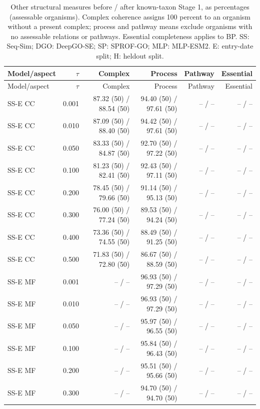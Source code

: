 \begingroup\scriptsize
\setlength{\tabcolsep}{4pt}
\begin{longtable}{lrrrrr}
\caption{Other structural measures before / after known-taxon Stage 1, as percentages (assessable organisms). Complex coherence assigns 100 percent to an organism without a present complex; process and pathway means exclude organisms with no assessable relations or pathways. Essential completeness applies to BP. SS: Seq-Sim; DGO: DeepGO-SE; SP: SPROF-GO; MLP: MLP-ESM2. E: entry-date split; H: heldout split.}\label{tab:supp-threshold-structure}\\
\toprule
Model/aspect & $\tau$ & Complex & Process & Pathway & Essential \\
\midrule
\endfirsthead
\toprule
Model/aspect & $\tau$ & Complex & Process & Pathway & Essential \\
\midrule
\endhead
SS-E CC & 0.001 & 87.32 (50) / 88.54 (50) & 94.40 (50) / 97.61 (50) & -- / -- & -- / -- \\
SS-E CC & 0.010 & 87.09 (50) / 88.40 (50) & 94.42 (50) / 97.61 (50) & -- / -- & -- / -- \\
SS-E CC & 0.050 & 83.33 (50) / 84.87 (50) & 92.70 (50) / 97.22 (50) & -- / -- & -- / -- \\
SS-E CC & 0.100 & 81.23 (50) / 82.41 (50) & 92.43 (50) / 97.11 (50) & -- / -- & -- / -- \\
SS-E CC & 0.200 & 78.45 (50) / 79.66 (50) & 91.14 (50) / 95.13 (50) & -- / -- & -- / -- \\
SS-E CC & 0.300 & 76.00 (50) / 77.24 (50) & 89.53 (50) / 94.24 (50) & -- / -- & -- / -- \\
SS-E CC & 0.400 & 73.36 (50) / 74.55 (50) & 88.49 (50) / 91.25 (50) & -- / -- & -- / -- \\
SS-E CC & 0.500 & 71.83 (50) / 72.80 (50) & 86.67 (50) / 88.59 (50) & -- / -- & -- / -- \\
SS-E MF & 0.001 & -- / -- & 96.93 (50) / 97.29 (50) & -- / -- & -- / -- \\
SS-E MF & 0.010 & -- / -- & 96.93 (50) / 97.29 (50) & -- / -- & -- / -- \\
SS-E MF & 0.050 & -- / -- & 95.97 (50) / 96.55 (50) & -- / -- & -- / -- \\
SS-E MF & 0.100 & -- / -- & 95.84 (50) / 96.43 (50) & -- / -- & -- / -- \\
SS-E MF & 0.200 & -- / -- & 95.51 (50) / 95.66 (50) & -- / -- & -- / -- \\
SS-E MF & 0.300 & -- / -- & 94.70 (50) / 94.70 (50) & -- / -- & -- / -- \\

\end{longtable}

